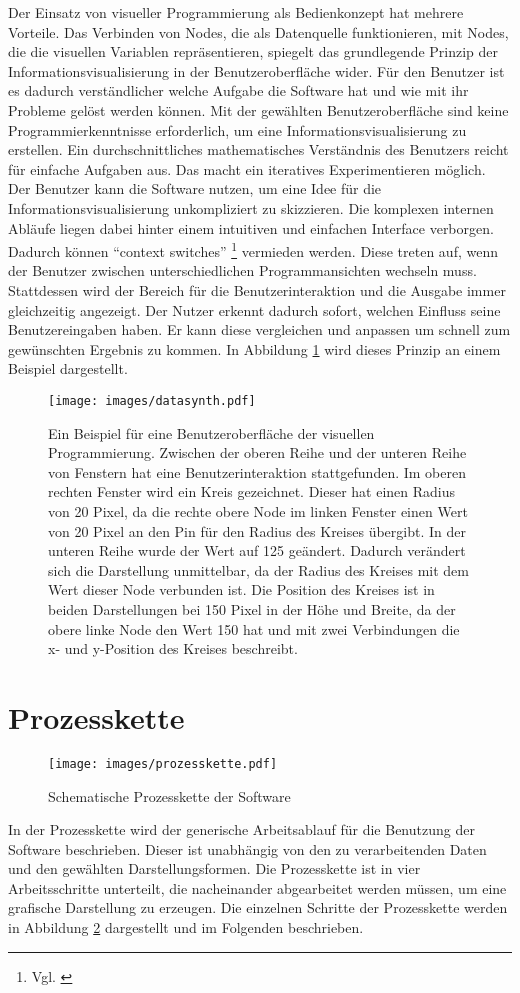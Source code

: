\documentclass[a4paper, 
               12pt,
               DIV=calc,
               version=first,
               pdftex,
               headsepline,
               footsepline,
               bibtotocnumbered,
               liststotocnumbered]{scrreprt}
\begin{document}
Der Einsatz von visueller Programmierung als Bedienkonzept hat
mehrere Vorteile. Das Verbinden von Nodes, die als Datenquelle funktionieren, mit Nodes, die
die visuellen Variablen repräsentieren, spiegelt das grundlegende
Prinzip der Informationsvisualisierung in der Benutzeroberfläche wider. Für den Benutzer ist
es dadurch verständlicher welche Aufgabe die Software hat und wie mit ihr Probleme gelöst
werden können.
Mit der gewählten Benutzeroberfläche sind keine Programmierkenntnisse erforderlich, um eine Informationsvisualisierung
zu erstellen. Ein durchschnittliches mathematisches Verständnis des Benutzers reicht für einfache Aufgaben aus.
Das macht ein iteratives Experimentieren möglich. Der Benutzer kann die Software nutzen, um eine
Idee für die Informationsvisualisierung unkompliziert zu skizzieren.
Die komplexen internen Abläufe liegen dabei hinter einem intuitiven und einfachen Interface
verborgen. Dadurch können "`context switches"' \footnote{Vgl. \citep[S.\,50]{Tufte}}
vermieden werden. Diese treten auf, wenn der Benutzer zwischen unterschiedlichen Programmansichten wechseln
muss. Stattdessen wird der Bereich für die Benutzerinteraktion und die Ausgabe
immer gleichzeitig angezeigt. Der Nutzer erkennt dadurch sofort, welchen Einfluss seine Benutzereingaben haben. Er
kann diese vergleichen und anpassen um schnell zum gewünschten Ergebnis zu kommen.
In Abbildung \ref{fig:datasynth} wird dieses Prinzip an einem Beispiel dargestellt.
\begin{figure}
\centering
\texttt{[image: images/datasynth.pdf]}
\caption{Ein Beispiel für eine Benutzeroberfläche der visuellen Programmierung. Zwischen der oberen Reihe
und der unteren Reihe von Fenstern hat eine Benutzerinteraktion stattgefunden.
Im oberen rechten Fenster wird ein Kreis gezeichnet. Dieser hat einen Radius von 20 Pixel, da
die rechte obere Node im linken Fenster einen Wert von 20 Pixel an den Pin für den Radius des Kreises übergibt.
In der unteren Reihe wurde der Wert auf 125 geändert. Dadurch verändert sich
die Darstellung unmittelbar, da der Radius des Kreises mit dem Wert dieser Node verbunden ist. Die Position
des Kreises ist in beiden Darstellungen bei 150 Pixel in der Höhe und Breite, da der obere linke Node den Wert 150 hat und mit
zwei Verbindungen die x- und y-Position des Kreises beschreibt.}
\label{fig:datasynth}
\end{figure}

\newpage
\section{Prozesskette}
\begin{figure}
\centering
\texttt{[image: images/prozesskette.pdf]}
\caption{Schematische Prozesskette der Software}
\label{fig:prozesskette}
\end{figure}
In der Prozesskette wird der generische Arbeitsablauf für die Benutzung
der Software beschrieben. Dieser ist unabhängig von den zu verarbeitenden Daten
und den gewählten Darstellungsformen. Die Prozesskette ist in vier
Arbeitsschritte unterteilt, die nacheinander abgearbeitet werden müssen,
um eine grafische Darstellung zu erzeugen.
Die einzelnen Schritte der Prozesskette werden in Abbildung \ref{fig:prozesskette} dargestellt und im
Folgenden beschrieben.
\end{document}
